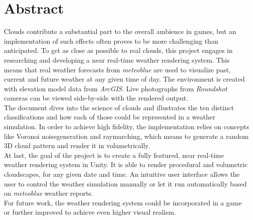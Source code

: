 \section*{Abstract}
Clouds contribute a substantial part to the overall ambience in games, but an implementation of such effects often proves to be more challenging than anticipated.
To get as close as possible to real clouds, this project engages in researching and developing a near real-time weather rendering system.
This means that real weather forecasts from \emph{meteoblue} are used to visualize past, current and future weather at any given time of day.
The environment is created with elevation model data from \emph{ArcGIS}. Live photographs from \emph{Roundshot} cameras can be viewed side-by-side with the rendered output.
\\
The document dives into the science of clouds and illustrates the ten distinct classifications and how each of those could be represented in a weather simulation. 
In order to achieve high fidelity, the implementation relies on concepts like Voronoi \gls{noisegeneration} and \gls{raymarching}, which means to generate a random 3D cloud pattern and render it in volumetrically.
\\
At last, the goal of the project is to create a fully featured, near real-time weather rendering system in Unity.
It is able to render \gls{procedural} and volumetric cloudscapes, for any given date and time.
An intuitive user interface allows the user to control the weather simulation manually or let it run automatically based on \emph{meteoblue} weather reports.
\\
For future work, the weather rendering system could be incorporated in a game or further improved to achieve even higher visual realism.